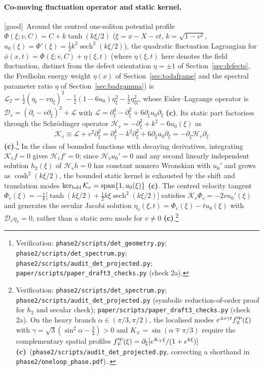 \documentclass[11pt,a4paper]{article}
\newcommand{\lab}[1]{{\normalfont\sffamily\footnotesize\bfseries(#1)}}
\newcommand{\Lc}{\lab{c}}
\newcommand{\eqtag}[2]{{\normalfont\sffamily\footnotesize\textcolor{#1}{[#2]}}}
\newcommand{\Good}{\eqtag{teal!70!black}{good}}
\newcommand{\scr}[1]{\nolinkurl{#1}}
\newcommand{\chk}[1]{\footnote{\raggedright Verification: #1.}}
\newcommand{\sech}{\operatorname{sech}}
\theoremstyle{remark}
\begin{document}
\paragraph{Co-moving fluctuation operator and static kernel.} \Good\ Around the centred one-soliton potential profile $\Phi(\xi;v,C)=C+k\tanh(k\xi/2)$ ($\xi=x-X-vt$, $k=\sqrt{1-v^2}$, $u_0(\xi)=\Phi'(\xi)=\tfrac12k^2\sech^2(k\xi/2)$), the quadratic fluctuation Lagrangian for $\phi(x,t)=\Phi(\xi;v,C)+\eta(\xi,t)$ (where $\eta(\xi,t)$ here denotes the field fluctuation, distinct from the defect orientation $\eta=\pm1$ of Section~\ref{sec:defects}, the Fredholm energy weight $\eta(x)$ of Section~\ref{sec:todaframe} and the spectral parameter ratio $\eta$ of Section~\ref{sec:badgamma}) is $\mathcal L_2=\tfrac12(\eta_t-v\eta_\xi)^2-\tfrac12(1-6u_0)\eta_\xi^2-\tfrac12\eta_{\xi\xi}^2$, whose Euler--Lagrange operator is $\mathcal D_v=(\partial_t-v\partial_\xi)^2+\mathcal L$ with $\mathcal L=\partial_\xi^4-\partial_\xi^2+6\partial_\xi u_0\partial_\xi$ \Lc. Its static part factorises through the Schr\"odinger operator $\mathcal H_v=-\partial_\xi^2+k^2-6u_0(\xi)$ as
\begin{equation}\label{eq:Kvfact}
\mathcal K_v\equiv\mathcal L+v^2\partial_\xi^2=\partial_\xi^4-k^2\partial_\xi^2+6\partial_\xi u_0\partial_\xi=-\partial_\xi\mathcal H_v\partial_\xi
\end{equation}
\Lc.\chk{\scr{phase2/scripts/det_geometry.py}; \scr{phase2/scripts/det_spectrum.py}; \scr{phase2/scripts/audit_det_projected.py}; \scr{paper/scripts/paper_draft3_checks.py} (check 2a)}
In the class of bounded functions with decaying derivatives, integrating $\mathcal K_vf=0$ gives $\mathcal H_vf'=0$; since $\mathcal H_vu_0'=0$ and any second linearly independent solution $h_2(\xi)$ of $\mathcal H_vh=0$ has constant nonzero Wronskian with $u_0'$ and grows as $\cosh^2(k\xi/2)$, the bounded static kernel is exhausted by the shift and translation modes $\ker_{\rm bdd}\mathcal K_v=\operatorname{span}\{1,u_0(\xi)\}$ \Lc. The centred velocity tangent $\Phi_v(\xi)=-\frac vk\big[\tanh(k\xi/2)+\tfrac12k\xi\sech^2(k\xi/2)\big]$ satisfies $\mathcal K_v\Phi_v=-2vu_0'(\xi)$ and generates the secular Jacobi solution $\eta_v(\xi,t)=\Phi_v(\xi)-tu_0(\xi)$ with $\mathcal D_v\eta_v=0$, rather than a static zero mode for $v\neq0$ \Lc.\chk{\scr{phase2/scripts/det_spectrum.py}; \scr{phase2/scripts/audit_det_projected.py} (symbolic reduction-of-order proof for $h_2$ and secular check); \scr{paper/scripts/paper_draft3_checks.py} (check 2a). On the heavy branch $\alpha\in(\pi/3,\pi/2)$, the localised modes $e^{\pm\epsilon\gamma t}f_\mp^{\rm sp}(\xi)$ with $\gamma=\sqrt3(\sin^2\alpha-\tfrac34)>0$ and $K_\mp=\sin(\alpha\mp\pi/3)$ require the complementary spatial profiles $f_\mp^{\rm sp}(\xi)=\partial_\xi[e^{K_\mp\xi}/(1+e^{k\xi})]$ \Lc\ (\scr{phase2/scripts/audit_det_projected.py}, correcting a shorthand in \scr{phase2/oneloop_phase.pdf}).}
\end{document}

